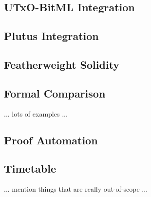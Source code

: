 \documentclass[acmsmall,nonacm=true,screen=true]{acmart}
\begin{document}
\subsection{UTxO-BitML Integration}

\subsection{Plutus Integration}

\subsection{Featherweight Solidity}

\subsection{Formal Comparison}
... lots of examples ...

\subsection{Proof Automation}

\subsection{Timetable}

... mention things that are really out-of-scope ...
\end{document}
